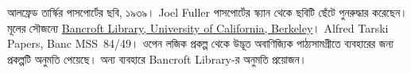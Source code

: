 আলফ্রেড তার্স্কির পাসপোর্টের ছবি, ১৯৩৯। Joel Fuller পাসপোর্টের স্ক্যান
থেকে ছবিটি ছেঁটে পুনরুদ্ধার করেছেন। মূলের সৌজন্যে
\href{http://www.lib.berkeley.edu/libraries/bancroft-library}{Bancroft
Library, University of California, Berkeley}। Alfred Tarski Papers,
Banc MSS~84/49। ওপেন লজিক প্রকল্প থেকে উদ্ভূত অবাণিজ্যিক
পাঠ্যসামগ্রীতে ব্যবহারের জন্য প্রকল্পটি অনুমতি পেয়েছে। অন্য ব্যবহারে
Bancroft Library-র অনুমতি প্রয়োজন।
